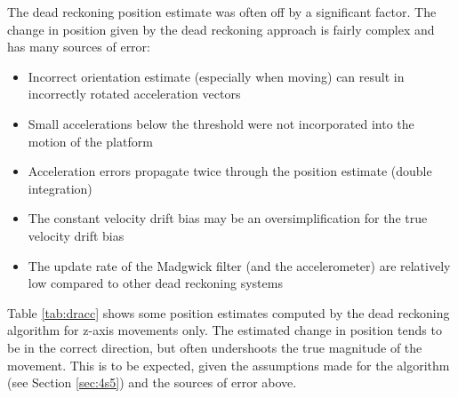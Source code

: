 \documentclass[12pt,a4paper]{report}
\begin{document}
The dead reckoning position estimate was often off by a significant factor. The change in position given by the dead reckoning approach is fairly complex and has many sources of error:
\begin{itemize}[noitemsep,topsep=0pt,]
	\item Incorrect orientation estimate (especially when moving) can result in incorrectly rotated acceleration vectors
	\item Small accelerations below the threshold were not incorporated into the motion of the platform
	\item Acceleration errors propagate twice through the position estimate (double integration)
	\item The constant velocity drift bias may be an oversimplification for the true velocity drift bias
	\item The update rate of the Madgwick filter (and the accelerometer) are relatively low compared to other dead reckoning systems \cite{imuadvnav} \cite{ekfmadmah}
\end{itemize}

Table \ref{tab:dracc} shows some position estimates computed by the dead reckoning algorithm for z-axis movements only. The estimated change in position tends to be in the correct direction, but often undershoots the true magnitude of the movement. This is to be expected, given the assumptions made for the algorithm (see Section \ref{sec:4s5}) and the sources of error above.
\end{document}
